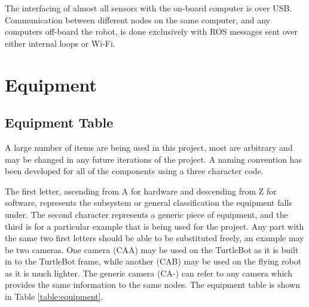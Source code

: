 \documentclass{article}[12]
\begin{document}
	The interfacing of almost all sensors with the on-board computer is over USB. Communication between different nodes on the same computer, and any computers off-board the robot, is done exclusively with ROS messages sent over either internal loops or Wi-Fi.

\section{Equipment}

	\subsection{Equipment Table}
	
	A large number of items are being used in this project, most are arbitrary and may be changed in any future iterations of the project. A naming convention has been developed for all of the components using a three character code.
	
	The first letter, ascending from A for hardware and descending from Z for software, represents the subsystem or general classification the equipment falls under. The second character represents a generic piece of equipment, and the third is for a particular example that is being used for the project. Any part with the same two first letters should be able to be substituted freely, an example may be two cameras. One camera (CAA) may be used on the TurtleBot as it is built in to the TurtleBot frame, while another (CAB) may be used on the flying robot as it is much lighter. The generic camera (CA-) can refer to any camera which provides the same information to the same nodes. The equipment table is shown in Table \ref{table:equipment}.
	
\end{document}
